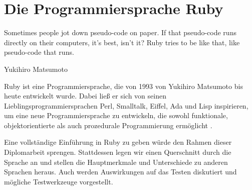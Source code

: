 \chapter{Die Programmiersprache Ruby}
\label{sec:ruby}
\epigraph{Sometimes people jot down pseudo-code on paper. If that pseudo-code runs directly on their computers, it's best, isn't it? Ruby tries to be like that, like pseudo-code that runs.}{Yukihiro Matsumoto}

Ruby ist eine Programmiersprache, die von 1993 von Yukihiro Matsumoto bis heute entwickelt wurde. Dabei ließ er sich von seinen Lieblingsprogrammiersprachen Perl, Smalltalk, Eiffel, Ada und Lisp inspirieren, um eine neue Programmiersprache zu entwickeln, die sowohl funktionale, objektorientierte als auch prozedurale Programmierung ermöglicht \citep{ruby_visual_identity_team_about_2011}. 

Eine vollständige Einführung in Ruby zu geben würde den Rahmen dieser Diplomarbeit sprengen. Stattdessen legen wir einen Querschnitt durch die Sprache an und stellen die Hauptmerkmale und Unterschiede zu anderen Sprachen heraus. Auch werden Auswirkungen auf das Testen diskutiert und mögliche Testwerkzeuge vorgestellt.

